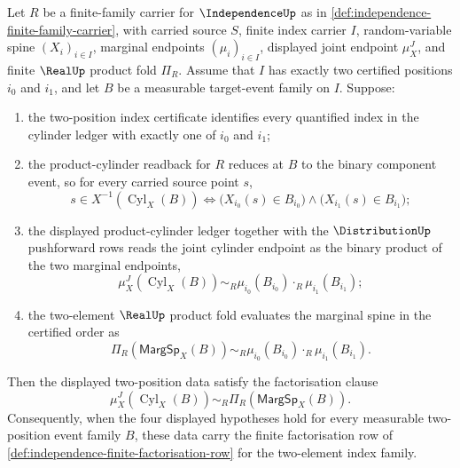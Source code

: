 \begin{theorem}
\label{thm:independence-two-element-index-factorization-row}
Let $R$ be a finite-family carrier for $\IndependenceUp$ as in \autoref{def:independence-finite-family-carrier}, with carried source $S$, finite index carrier $I$, random-variable spine $(X_i)_{i\in I}$, marginal endpoints $(\mu_i)_{i\in I}$, displayed joint endpoint $\mu_X^J$, and finite $\RealUp$ product fold $\Pi_R$. Assume that $I$ has exactly two certified positions $i_0$ and $i_1$, and let $B$ be a measurable target-event family on $I$. Suppose:
\begin{enumerate}
\item the two-position index certificate identifies every quantified index in the cylinder ledger with exactly one of $i_0$ and $i_1$;
\item the product-cylinder readback for $R$ reduces at $B$ to the binary component event, so for every carried source point $s$,
$$
s\in X^{-1}(\operatorname{Cyl}_X(B))
\Longleftrightarrow
\bigl(X_{i_0}(s)\in B_{i_0}\bigr)\land\bigl(X_{i_1}(s)\in B_{i_1}\bigr);
$$
\item the displayed product-cylinder ledger together with the $\DistributionUp$ pushforward rows reads the joint cylinder endpoint as the binary product of the two marginal endpoints,
$$
\mu_X^J(\operatorname{Cyl}_X(B))
\sim_R
\mu_{i_0}(B_{i_0})\cdot_R\mu_{i_1}(B_{i_1});
$$
\item the two-element $\RealUp$ product fold evaluates the marginal spine in the certified order as
$$
\Pi_R(\mathsf{MargSp}_X(B))
\sim_R
\mu_{i_0}(B_{i_0})\cdot_R\mu_{i_1}(B_{i_1}).
$$
\end{enumerate}
Then the displayed two-position data satisfy the factorisation clause
$$
\mu_X^J(\operatorname{Cyl}_X(B))\sim_R\Pi_R(\mathsf{MargSp}_X(B)).
$$
Consequently, when the four displayed hypotheses hold for every measurable two-position event family $B$, these data carry the finite factorisation row of \autoref{def:independence-finite-factorisation-row} for the two-element index family.
\end{theorem}
